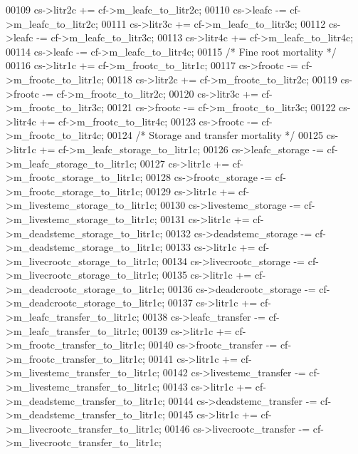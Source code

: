 \begin{DoxyCode}
00109     cs->litr2c         += cf->m\_leafc\_to\_litr2c;
00110     cs->leafc          -= cf->m\_leafc\_to\_litr2c;
00111     cs->litr3c         += cf->m\_leafc\_to\_litr3c;
00112     cs->leafc          -= cf->m\_leafc\_to\_litr3c;
00113     cs->litr4c         += cf->m\_leafc\_to\_litr4c;
00114     cs->leafc          -= cf->m\_leafc\_to\_litr4c;
00115     \textcolor{comment}{/*   Fine root mortality */}
00116     cs->litr1c         += cf->m\_frootc\_to\_litr1c;
00117     cs->frootc         -= cf->m\_frootc\_to\_litr1c;
00118     cs->litr2c         += cf->m\_frootc\_to\_litr2c;
00119     cs->frootc         -= cf->m\_frootc\_to\_litr2c;
00120     cs->litr3c         += cf->m\_frootc\_to\_litr3c;
00121     cs->frootc         -= cf->m\_frootc\_to\_litr3c;
00122     cs->litr4c         += cf->m\_frootc\_to\_litr4c;
00123     cs->frootc         -= cf->m\_frootc\_to\_litr4c;
00124     \textcolor{comment}{/*   Storage and transfer mortality */}
00125     cs->litr1c              += cf->m\_leafc\_storage\_to\_litr1c;
00126     cs->leafc\_storage       -= cf->m\_leafc\_storage\_to\_litr1c;
00127     cs->litr1c              += cf->m\_frootc\_storage\_to\_litr1c;
00128     cs->frootc\_storage      -= cf->m\_frootc\_storage\_to\_litr1c;
00129     cs->litr1c              += cf->m\_livestemc\_storage\_to\_litr1c;
00130     cs->livestemc\_storage   -= cf->m\_livestemc\_storage\_to\_litr1c;
00131     cs->litr1c              += cf->m\_deadstemc\_storage\_to\_litr1c;
00132     cs->deadstemc\_storage   -= cf->m\_deadstemc\_storage\_to\_litr1c;
00133     cs->litr1c              += cf->m\_livecrootc\_storage\_to\_litr1c;
00134     cs->livecrootc\_storage  -= cf->m\_livecrootc\_storage\_to\_litr1c;
00135     cs->litr1c              += cf->m\_deadcrootc\_storage\_to\_litr1c;
00136     cs->deadcrootc\_storage  -= cf->m\_deadcrootc\_storage\_to\_litr1c;
00137     cs->litr1c              += cf->m\_leafc\_transfer\_to\_litr1c;
00138     cs->leafc\_transfer      -= cf->m\_leafc\_transfer\_to\_litr1c;
00139     cs->litr1c              += cf->m\_frootc\_transfer\_to\_litr1c;
00140     cs->frootc\_transfer     -= cf->m\_frootc\_transfer\_to\_litr1c;
00141     cs->litr1c              += cf->m\_livestemc\_transfer\_to\_litr1c;
00142     cs->livestemc\_transfer  -= cf->m\_livestemc\_transfer\_to\_litr1c;
00143     cs->litr1c              += cf->m\_deadstemc\_transfer\_to\_litr1c;
00144     cs->deadstemc\_transfer  -= cf->m\_deadstemc\_transfer\_to\_litr1c;
00145     cs->litr1c              += cf->m\_livecrootc\_transfer\_to\_litr1c;
00146     cs->livecrootc\_transfer -= cf->m\_livecrootc\_transfer\_to\_litr1c;

\end{DoxyCode}
